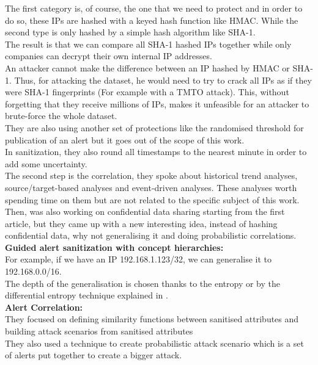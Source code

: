 \documentclass{eplmastersthesis}
\begin{document}
The first category is, of course, the one that we need to protect and in order to do so, these IPs are hashed with a keyed hash function like HMAC. While the second type is only hashed by a simple hash algorithm like SHA-1.\\
The result is that we can compare all SHA-1 hashed IPs together while only companies can decrypt their own internal IP addresses.\\
An attacker cannot make the difference between an IP hashed by HMAC  or SHA-1. Thus, for attacking the dataset, he would need to try to crack all IPs as if they were SHA-1 fingerprints (For example with a TMTO attack). This, without forgetting that they receive millions of IPs, makes it unfeasible for an attacker to brute-force the whole dataset.\\
They are also using another set of protections like the randomised threshold for publication of an alert but it goes out of the scope of this work.\\ 
In sanitization, they also round all timestamps to the nearest minute in order to add some uncertainty.\\
The second step is the correlation, they spoke about historical trend analyses, source/target-based analyses and event-driven analyses. These analyses worth spending time on them but are not related to the specific subject of this work.\\

Then, \cite{xu2005privacy} was also working on confidential data sharing starting from the first article, but they came up with a new interesting idea, instead of hashing confidential data, why not generalising it and doing probabilistic correlations.\\
\textbf{Guided alert sanitization with concept hierarchies:}\\
For example, if we have an IP 192.168.1.123/32, we can generalise it to 192.168.0.0/16.\\
The depth of the generalisation is chosen thanks to the entropy or by the differential entropy technique explained in \cite{cover1991elements}.
\\
\textbf{Alert Correlation:}\\
They focused on defining similarity functions between sanitised attributes and building attack scenarios from sanitised attributes\\
They also used a technique to create probabilistic attack scenario which is a set of alerts put together to create a bigger attack.\\
\end{document}
